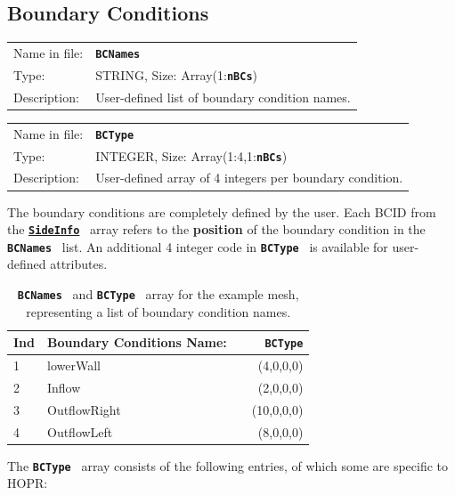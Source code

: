 \documentclass[a4paper,headsepline]{scrreprt}
\newcommand\ttbf[1]{\textbf{\texttt{#1}}}
\newcommand\SideInfo{\hyperlink{SideInfo}{\ttbf{SideInfo}}}
\newcommand\BCNames{\ttbf{BCNames}}
\newcommand\BCType{\ttbf{BCType}}
\newcommand\nBCs{\ttbf{nBCs}}
\begin{document}
\newpage

\subsection{Boundary Conditions}
\label{sec:BC}

\begin{tabularx}{1.0\textwidth}{lX}
Name in file: & \BCNames \\
Type:         & STRING, \quad Size: Array(1:\nBCs)  \\
Description:  & User-defined list of boundary condition names. \\
\end{tabularx}

\begin{tabularx}{1.0\textwidth}{lX}
Name in file: & \BCType \\
Type:         & INTEGER, \quad Size: Array(1:4,1:\nBCs)  \\
Description:  & User-defined array of 4 integers per boundary condition. \\
\end{tabularx}

The boundary conditions are completely defined by the user. Each BCID from the \SideInfo~ array refers to the \textbf{position} of the boundary condition in the \BCNames~ list. An additional 4 integer code in \BCType~ is available for user-defined attributes.

\begin{table}[h!]
\centering
\begin{tabular}{|l|l|c|r|} \hline
Ind & Boundary Conditions Name: & & \BCType    \\ \hline
1   &  lowerWall                & & (4,0,0,0)  \\
2   &  Inflow                   & & (2,0,0,0)  \\
3   &  OutflowRight             & & (10,0,0,0) \\
4   &  OutflowLeft              & & (8,0,0,0)  \\ \hline
\end{tabular}
\caption{\BCNames~ and \BCType~ array for the example mesh, representing a list of boundary condition names.}
\end{table}


\smallskip
The \BCType~ array consists of the following entries, of which some are specific to HOPR:
\end{document}

